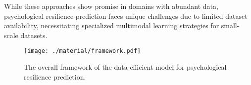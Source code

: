 While these approaches show promise in domains with abundant data, psychological resilience prediction faces unique challenges due to limited dataset availability, necessitating specialized multimodal learning strategies for small-scale datasets.

\begin{figure*}[]
    \begin{center}
        \texttt{[image: ./material/framework.pdf]}
    \end{center}
    \caption{The overall framework of the data-efficient model for psychological resilience prediction.}
    \label{figure:framework}
\end{figure*}